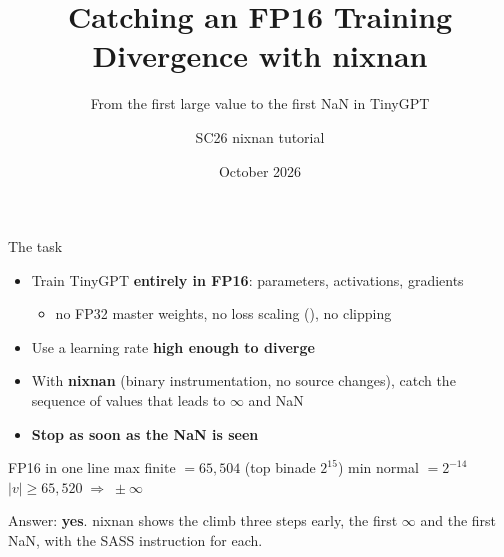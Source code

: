 \documentclass[aspectratio=169,11pt]{beamer}
\title[FP16 divergence under nixnan]{Catching an FP16 Training Divergence with nixnan}
\subtitle{From the first large value to the first NaN in TinyGPT}
\author[SC26 nixnan tutorial]{SC26 nixnan tutorial}
\institute[]{\texttt{flash-attn-expt/fp16-divergence}, branch \texttt{Flash-Attn}}
\date{October 2026}
\newcommand{\code}[1]{\texttt{\detokenize{#1}}}
\newcommand{\NaN}{NaN}
\begin{document}
\begin{frame}
\titlepage
\end{frame}

\begin{frame}{The task}
\begin{itemize}
\item Train TinyGPT \textbf{entirely in FP16}: parameters, activations, gradients
  \begin{itemize}
  \item no FP32 master weights, no loss scaling (\code{GradScaler}), no clipping
  \end{itemize}
\item Use a learning rate \textbf{high enough to diverge}
\item With \textbf{nixnan} (binary instrumentation, no source changes), catch the sequence of values
  that leads to $\infty$ and \NaN
\item \textbf{Stop as soon as the \NaN{} is seen}
\end{itemize}
\vspace{3mm}
\begin{block}{FP16 in one line}
max finite $= 65{,}504$ \quad (top binade $2^{15}$) \qquad min normal $=2^{-14}$ \qquad
$|v|\geq 65{,}520 \;\Rightarrow\; \pm\infty$
\end{block}
\vspace{2mm}
Answer: \textbf{yes}. nixnan shows the climb three steps early, the first $\infty$ and the first \NaN, with the SASS instruction for each.
\end{frame}
\end{document}
